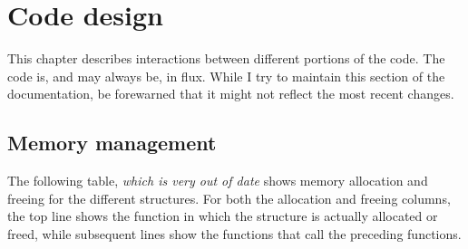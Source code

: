 \documentclass {scrbook}
\begin{document}
\chapter{Code design}

This chapter describes interactions between different portions of the code. The code is, and may always be, in flux. While I try to maintain this section of the documentation, be forewarned that it might not reflect the most recent changes.

\section{Memory management}

The following table, \emph{which is very out of date} shows memory allocation and freeing for the different structures. For both the allocation and freeing columns, the top line shows the function in which the structure is actually allocated or freed, while subsequent lines show the functions that call the preceding functions.
\end{document}
